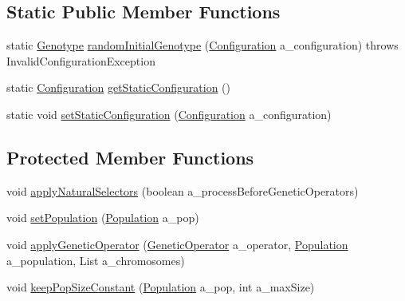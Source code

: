 \subsection*{Static Public Member Functions}
\begin{DoxyCompactItemize}
\item 
static \hyperlink{classorg_1_1jgap_1_1_genotype}{Genotype} \hyperlink{classorg_1_1jgap_1_1_genotype_a930184e2920b4642f20d0b8bc8412005}{random\-Initial\-Genotype} (\hyperlink{classorg_1_1jgap_1_1_configuration}{Configuration} a\-\_\-configuration)  throws Invalid\-Configuration\-Exception 
\item 
static \hyperlink{classorg_1_1jgap_1_1_configuration}{Configuration} \hyperlink{classorg_1_1jgap_1_1_genotype_aaf3d4bf0b470aa4655e85262289443eb}{get\-Static\-Configuration} ()
\item 
static void \hyperlink{classorg_1_1jgap_1_1_genotype_a2f44a7709eca83cddd6d794ee59e663c}{set\-Static\-Configuration} (\hyperlink{classorg_1_1jgap_1_1_configuration}{Configuration} a\-\_\-configuration)
\end{DoxyCompactItemize}
\subsection*{Protected Member Functions}
\begin{DoxyCompactItemize}
\item 
void \hyperlink{classorg_1_1jgap_1_1_genotype_a6c14c3a36aa8e4291840f0b9c0facb35}{apply\-Natural\-Selectors} (boolean a\-\_\-process\-Before\-Genetic\-Operators)
\item 
void \hyperlink{classorg_1_1jgap_1_1_genotype_ac56a4d112334db07ba333602c4a24706}{set\-Population} (\hyperlink{classorg_1_1jgap_1_1_population}{Population} a\-\_\-pop)
\item 
void \hyperlink{classorg_1_1jgap_1_1_genotype_a554d1eaf21a0a9437cdbc5b0fbeedef4}{apply\-Genetic\-Operator} (\hyperlink{interfaceorg_1_1jgap_1_1_genetic_operator}{Genetic\-Operator} a\-\_\-operator, \hyperlink{classorg_1_1jgap_1_1_population}{Population} a\-\_\-population, List a\-\_\-chromosomes)
\item 
void \hyperlink{classorg_1_1jgap_1_1_genotype_af5e224c5b7c05dbe02b3324d5ec16f2a}{keep\-Pop\-Size\-Constant} (\hyperlink{classorg_1_1jgap_1_1_population}{Population} a\-\_\-pop, int a\-\_\-max\-Size)
\end{DoxyCompactItemize}
